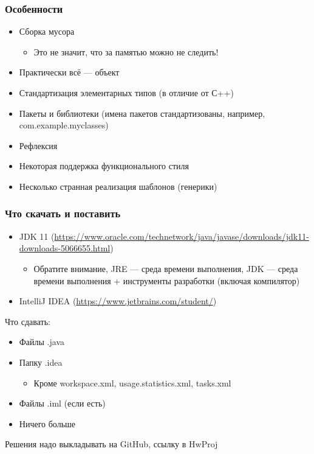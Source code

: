 \documentclass[xetex,mathserif,serif]{beamer}
\begin{document}
	\begin{frame}
		\frametitle{Особенности}
		\begin{itemize}
			\item Сборка мусора
			\begin{itemize}
				\item Это не значит, что за памятью можно не следить!
			\end{itemize}
			\item Практически всё --- объект
			\item Стандартизация элементарных типов (в отличие от С++)
			\item Пакеты и библиотеки (имена пакетов стандартизованы, например, com.example.myclasses)
			\item Рефлексия
			\item Некоторая поддержка функционального стиля
			\item Несколько странная реализация шаблонов (генерики)
		\end{itemize}
	\end{frame}

	\begin{frame}
		\frametitle{Что скачать и поставить}
		\begin{itemize}
			\item JDK 11 (\url{https://www.oracle.com/technetwork/java/javase/downloads/jdk11-downloads-5066655.html})
			\begin{itemize}
				\item Обратите внимание, JRE --- среда времени выполнения, JDK --- среда времени выполнения + инструменты разработки (включая компилятор)
			\end{itemize}
			\item IntelliJ IDEA (\url{https://www.jetbrains.com/student/})
		\end{itemize}
		Что сдавать:
		\begin{itemize}
			\item Файлы .java
			\item Папку .idea
			\begin{itemize}
				\item Кроме workspace.xml, usage.statistics.xml, tasks.xml
			\end{itemize}
			\item Файлы .iml (если есть)
			\item Ничего больше
		\end{itemize}
		Решения надо выкладывать на GitHub, ссылку в HwProj
	\end{frame}
\end{document}
